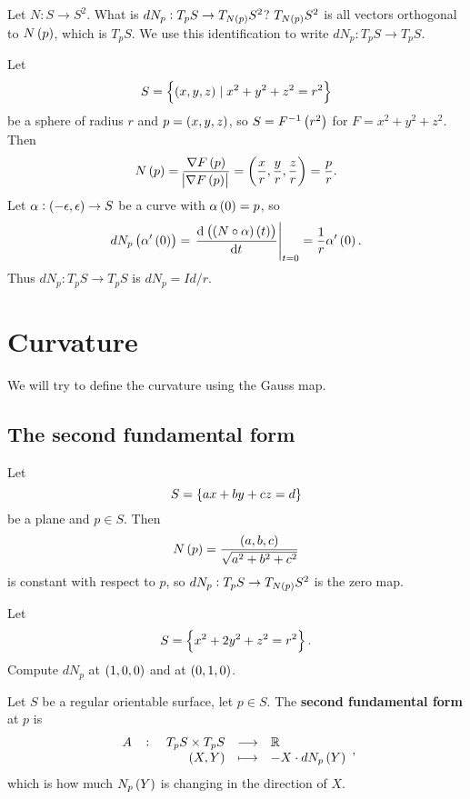 Let $ N : S \to S^2 $. What is $ dN_p : T_pS \to T_{N\br{p}}S^2 $? $ T_{N\br{p}}S^2 $ is all vectors orthogonal to $ N\br{p} $, which is $ T_pS $. We use this identification to write $ dN_p : T_pS \to T_pS $.

\begin{example*}
Let
$$ S = \cbr{\br{x, y, z} \mid x^2 + y^2 + z^2 = r^2} $$
be a sphere of radius $ r $ and $ p = \br{x, y, z} $, so $ S = F^{-1}\br{r^2} $ for $ F = x^2 + y^2 + z^2 $. Then
$$ N\br{p} = \dfrac{\nabla F\br{p}}{\abs{\nabla F\br{p}}} = \br{\dfrac{x}{r}, \dfrac{y}{r}, \dfrac{z}{r}} = \dfrac{p}{r}. $$
Let $ \alpha : \br{-\epsilon, \epsilon} \to S $ be a curve with $ \alpha\br{0} = p $, so
$$ dN_p\br{\alpha'\br{0}} = \eval{\dod{\br{\br{N \circ \alpha}\br{t}}}{t}}_{t = 0} = \dfrac{1}{r}\alpha'\br{0}. $$
Thus $ dN_p : T_pS \to T_pS $ is $ dN_p = Id / r $.
\end{example*}

\pagebreak

\section{Curvature}

We will try to define the curvature using the Gauss map.


\subsection{The second fundamental form}

\begin{example*}
Let
$$ S = \cbr{ax + by + cz = d} $$
be a plane and $ p \in S $. Then
$$ N\br{p} = \dfrac{\br{a, b, c}}{\sqrt{a^2 + b^2 + c^2}} $$
is constant with respect to $ p $, so $ dN_p : T_pS \to T_{N\br{p}}S^2 $ is the zero map.
\end{example*}

\begin{example*}
Let
$$ S = \cbr{x^2 + 2y^2 + z^2 = r^2}. $$
Compute $ dN_p $ at $ \br{1, 0, 0} $ and at $ \br{0, 1, 0} $.
\end{example*}

\begin{definition}
Let $ S $ be a regular orientable surface, let $ p \in S $. The \textbf{second fundamental form} at $ p $ is
$$ \function[A]{T_pS \times T_pS}{\R}{\br{X, Y}}{-X \cdot dN_p\br{Y}}, $$
which is how much $ N_p\br{Y} $ is changing in the direction of $ X $.
\end{definition}

